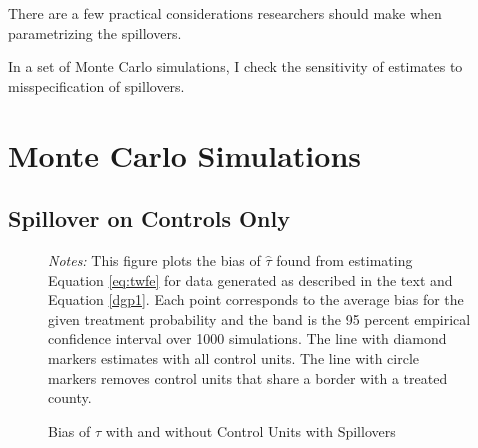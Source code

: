 \documentclass[11pt]{article}
\begin{document}
There are a few practical considerations researchers should make when parametrizing the spillovers. %

In a set of Monte Carlo simulations, I check the sensitivity of estimates to misspecification of spillovers.




\section{Monte Carlo Simulations}

\subsection{Spillover on Controls Only}

\begin{figure}[t]
    \caption{Bias of $\hat{\tau}$ with and without Control Units with Spillovers}
    \label{fig:bias_as_treat_prob}
    {\centering
    }

    {\footnotesize
        \textit{Notes:} This figure plots the bias of $\hat{\tau}$ found from estimating Equation \ref{eq:twfe} for data generated as described in the text and Equation \ref{dgp1}. Each point corresponds to the average bias for the given treatment probability and the band is the 95 percent empirical confidence interval over 1000 simulations. The line with diamond markers estimates with all control units. The line with circle markers removes control units that share a border with a treated county. 
    }
\end{figure}
\end{document}

